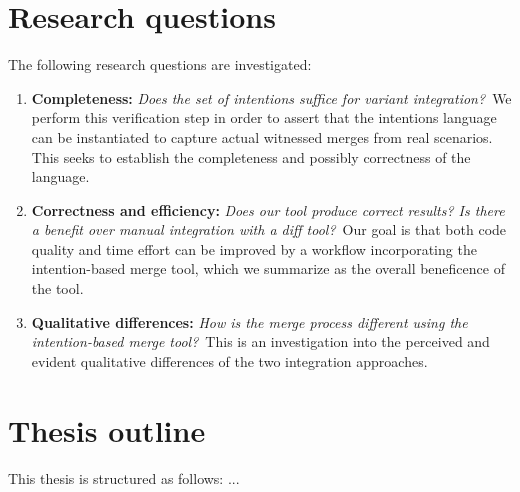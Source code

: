 \section{Research questions}
The following research questions are investigated:

\newcommand{\RQA}{Does the set of intentions suffice for variant integration?}
\newcommand{\RQB}{Does our tool produce correct results? Is there a benefit over manual integration with a diff tool?}
\newcommand{\RQC}{How is the merge process different using the intention-based merge tool?}

\begin{enumerate}[label={Q\arabic*}]

        \item\label{rq-a} \textbf{Completeness:} \textit{\RQA}~We perform this verification step in order to assert that the intentions language can be instantiated to capture actual witnessed merges from real scenarios. This seeks to establish the completeness and possibly correctness of the language.

        \item\label{rq-b} \textbf{Correctness and efficiency:} \textit{\RQB}~Our goal is that both code quality and time effort can be improved by a workflow incorporating the intention-based merge tool, which we summarize as the overall beneficence of the tool.

        
        \item\label{rq-c} \textbf{Qualitative differences:} \textit{\RQC}~This is an investigation into the perceived and evident qualitative differences of the two integration approaches.
        
\end{enumerate}

\section{Thesis outline}
This thesis is structured as follows: ...



